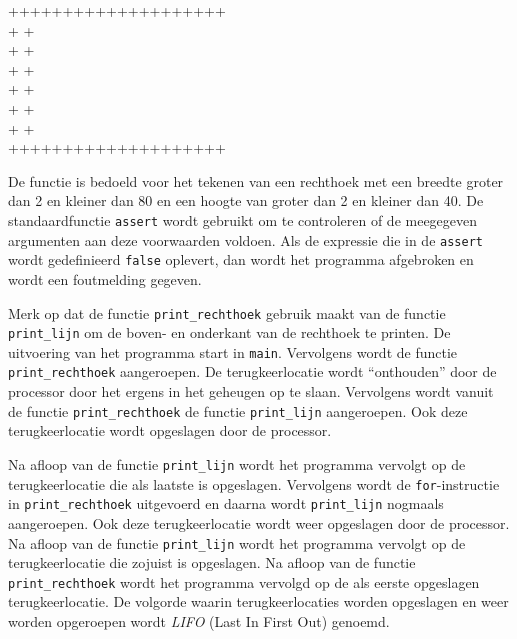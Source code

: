 


\begin{dosbox}
++++++++++++++++++++\\
+                  +\\
+                  +\\
+                  +\\
+                  +\\
+                  +\\
+                  +\\
++++++++++++++++++++
\end{dosbox}



De functie is bedoeld voor het tekenen van een rechthoek met een breedte groter dan 2 en kleiner dan 80 en een hoogte van groter dan 2 en kleiner dan 40. 
De standaardfunctie \texttt{assert} wordt gebruikt om te controleren of de meegegeven argumenten aan deze voorwaarden voldoen.
Als de expressie die in de \texttt{assert} wordt gedefinieerd \texttt{false} oplevert, dan wordt het programma afgebroken en wordt een foutmelding gegeven.

Merk op dat de functie \texttt{print\_rechthoek} gebruik maakt van de functie \texttt{print\_lijn} om de boven- en onderkant van de rechthoek te printen.
De uitvoering van het programma start in \texttt{main}.
Vervolgens wordt de functie \texttt{print\_rechthoek} aangeroepen.
De terugkeerlocatie wordt ``onthouden'' door de processor door het ergens in het geheugen op te slaan.
Vervolgens wordt vanuit de functie \texttt{print\_rechthoek} de functie \texttt{print\_lijn} aangeroepen. 
Ook deze terugkeerlocatie wordt opgeslagen door de processor.

Na afloop van de functie \texttt{print\_lijn} wordt het programma vervolgt op de terugkeerlocatie die als laatste is opgeslagen.
Vervolgens wordt de \texttt{for}-instructie in \texttt{print\_rechthoek} uitgevoerd en daarna wordt \texttt{print\_lijn} nogmaals aangeroepen.
Ook deze terugkeerlocatie wordt weer opgeslagen door de processor.
Na afloop van de functie \texttt{print\_lijn} wordt het programma vervolgt op de terugkeerlocatie die zojuist is opgeslagen.
Na afloop van de functie \texttt{print\_rechthoek} wordt het programma vervolgd op de als eerste opgeslagen terugkeerlocatie.
De volgorde waarin terugkeerlocaties worden opgeslagen en weer worden opgeroepen wordt \textsl{LIFO} (Last In First Out) genoemd.

